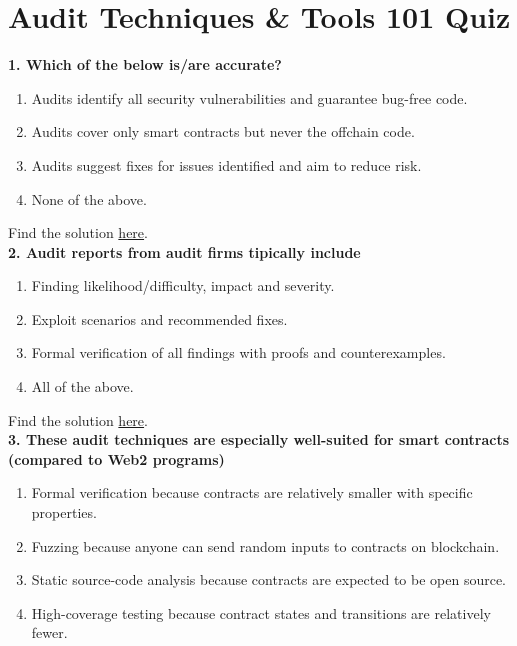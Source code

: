 \section{Audit Techniques \& Tools 101 Quiz}

\textbf{1. Which of the below is/are accurate?}

\begin{enumerate}[label=\Alph*.]
    \item Audits identify all security vulnerabilities and guarantee bug-free code.
    \item Audits cover only smart contracts but never the offchain code.
    \item Audits suggest fixes for issues identified and aim to reduce risk.
    \item None of the above.
\end{enumerate}

Find the solution \hyperref[sec:exam6_q1]{here}.\\

\textbf{2. Audit reports from audit firms tipically include}

\begin{enumerate}[label=\Alph*.]
    \item Finding likelihood/difficulty, impact and severity.
    \item Exploit scenarios and recommended fixes.
    \item Formal verification of all findings with proofs and counterexamples.
    \item All of the above.
\end{enumerate}

Find the solution \hyperref[sec:exam6_q2]{here}.\\

\textbf{3. These audit techniques are especially well-suited for smart contracts (compared to Web2 programs)}

\begin{enumerate}[label=\Alph*.]
    \item Formal verification because contracts are relatively smaller with specific properties.
    \item Fuzzing because anyone can send random inputs to contracts on blockchain.
    \item Static source-code analysis because contracts are expected to be open source.
    \item High-coverage testing because contract states and transitions are relatively fewer.
\end{enumerate}

